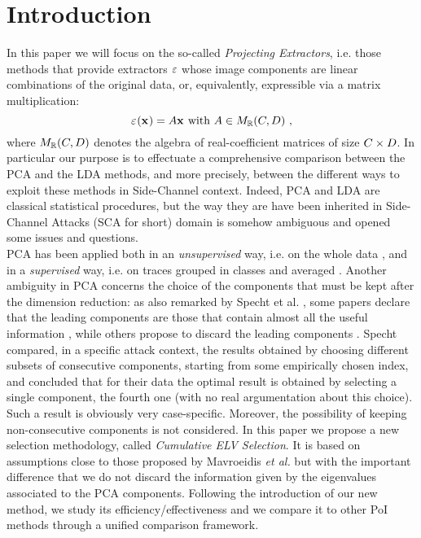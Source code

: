 \section{Introduction}

In this paper we will focus on the so-called {\em Projecting Extractors}, i.e. those methods that provide extractors $\extract$ whose image components are linear combinations of the original data, or, equivalently, expressible via a matrix multiplication:
\begin{equation}
\extractor{\sss[]{}} = A\sss[]{} \mbox{ with } A \in M_{\mathbb{R}}(\newTraceLength, \traceLength) \mbox{ ,}
\end{equation}
where $ M_{\mathbb{R}}(\newTraceLength, \traceLength)$ denotes the algebra of real-coefficient matrices of size $\newTraceLength \times \traceLength$.  In particular our purpose is to effectuate a comprehensive comparison  between the PCA and the LDA methods, and more precisely, between the different ways to exploit these methods in Side-Channel context. Indeed, PCA and LDA are classical statistical procedures, but the way they are have been inherited in Side-Channel Attacks (SCA for short) domain is somehow ambiguous and opened some issues and questions.\\
PCA has been applied both in an {\em unsupervised} way, i.e. on the whole data \cite{Batina2012,karsmakers2009side}, and in a {\em supervised} way, i.e. on traces grouped in classes and averaged \cite{TAprincipal,choudaryefficient,choudary2014efficient,disassembler,Standaert2008}. Another ambiguity in PCA concerns the choice of the components that must be kept after the dimension reduction: as also remarked by Specht et al.  \cite{specht}, some papers declare that the leading components are those that contain almost all the useful information \cite{TAprincipal}, while others propose to discard the leading components \cite{Batina2012}. Specht compared, in a specific attack context, the results obtained by choosing different subsets of consecutive components, starting from some empirically chosen index, and concluded that for their data the optimal result is obtained by selecting a single component, the fourth one (with no real argumentation about this choice). Such a result is obviously very case-specific. Moreover, the possibility of keeping non-consecutive components is not considered. In this paper we propose a new selection methodology, called {\em Cumulative ELV Selection}. It is based on assumptions close to those proposed by Mavroeidis \textit{et al.} \cite{SCAclassProbl} but with the important difference that we do not discard the information given by the eigenvalues associated to the PCA components. Following the introduction of our new method, we study its efficiency/effectiveness and we compare it to other PoI methods through a unified comparison framework. \\

